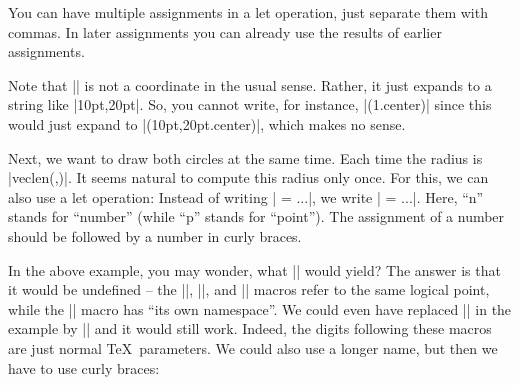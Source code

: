 \begin{paracol}{2}

You can have multiple assignments in a let operation, just separate them with
commas. In later assignments you can already use the results of earlier
assignments.

Note that || is not a coordinate in the usual sense. Rather, it just expands
to a string like |10pt,20pt|. So, you cannot write, for instance,
|(\p1.center)| since this would just expand to |(10pt,20pt.center)|, which
makes no sense.

Next, we want to draw both circles at the same time. Each time the radius is
|veclen(,)|. It seems natural to compute this radius only once. For this,
we can also use a let operation: Instead of writing | = ...|, we write
| = ...|. Here, ``n'' stands for ``number'' (while ``p'' stands for
``point''). The assignment of a number should be followed by a number in curly
braces.
%
\begin{codeexample}[preamble={\usetikzlibrary{calc}}]
\end{codeexample}
%
In the above example, you may wonder, what || would yield? The answer is
that it would be undefined -- the |\p|, |\x|, and |\y| macros refer to the same
logical point, while the |\n| macro has ``its own namespace''. We could even
have replaced || in the example by || and it would still work. Indeed,
the digits following these macros are just normal \TeX\ parameters. We could
also use a longer name, but then we have to use curly braces:
%
\begin{codeexample}[preamble={\usetikzlibrary{calc}}]
\end{codeexample}


\end{paracol}
